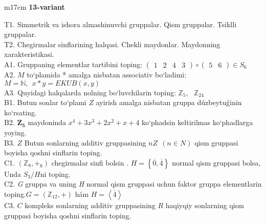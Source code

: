 \documentclass{article}
\begin{document}
\begin{tabular}{m{17cm}}
\textbf{13-variant}
\newline

T1. Simmetrik va ishora almashinuvchi gruppalar. Qism gruppalar. Tsiklli gruppalar. \\
T2. Chegirmalar sinflarining halqasi. Chekli maydonlar. Maydonning xarakteristikasi. \\
A1. Gruppaning elementlar tartibini toping: \(\begin{pmatrix}
1 & 2 & 4 & 3
\end{pmatrix} \circ \begin{pmatrix}
5 & 6
\end{pmatrix} \in S_{6}\) \\
A2. \(M\) to`plamida * amalga nisbatan associativ bo`ladimi: \(M\mathbb{= N},\ \ x*y = EKUB(x,y)\) \\
A3. Quyidagi halqalarda nolning bo`luvchilarin toping: \(\mathbb{Z}_{5},\ \ \ \mathbb{Z}_{24}\) \\
B1. Butun sonlar to`plami \(Z\) ayirish amalga nisbatan gruppa dúzbeytuǵinin ko`rsating. \\
B2. \(\mathbf{Z}_{\mathbf{5}}\) maydoninda \(x^{4} + 3x^{3} + 2x^{2} + x + 4\) ko`phadsin keltirilmas ko`phadlarga yoying. \\
B3. \(Z\) Butun sonlarning additiv gruppasining \(nZ\ \ (n \in N)\) qism gruppasi boyisha qo\textquotesingle shni sinflarin toping. \\
C1. \(\left( \mathbb{Z}_{8}, +_{8} \right)\) chegirmalar sinfi bo\textquotesingle lsin . \(H = \left\{ \overline{0},\overline{4} \right\}\) normal qism gruppasi bolsa, Unda \(S_{3}/H\)ni toping. \\
C2. \emph{G} gruppa va uning \emph{H} normal qism gruppasi uchun faktor gruppa elementlarin toping.\(G = (\mathbb{Z}_{12}, + )\) hám \(H = \left\langle \overline{4} \right\rangle\) \\
C3. \(C\) kompleks sonlarning additiv gruppasining \(R\) haqiyqiy sonlarning qism gruppasi boyisha qo\textquotesingle shni sinflarin toping. \\

\end{tabular}
\vspace{1cm}
\end{document}

